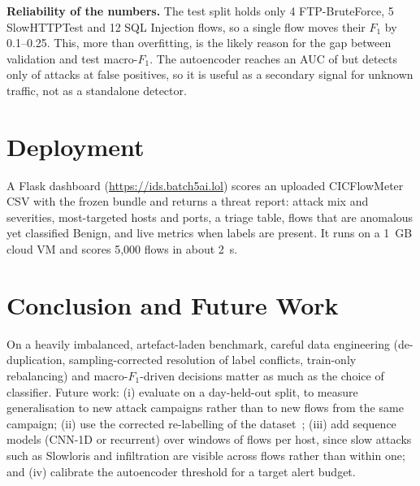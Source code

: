 \documentclass[conference]{IEEEtran}
\begin{document}
\textbf{Reliability of the numbers.} The test split holds only 4
FTP-BruteForce, 5 SlowHTTPTest and 12 SQL Injection flows, so a single flow
moves their $F_1$ by 0.1--0.25. This, more than overfitting, is the likely
reason for the gap between validation and test macro-$F_1$. The
autoencoder reaches an AUC of \AEAUC{} but detects only \AEDetectionRate{}
of attacks at \AEFalsePositiveRate{} false positives, so it is useful as a
secondary signal for unknown traffic, not as a standalone detector.

\section{Deployment}
A Flask dashboard (\url{https://ids.batch5ai.lol}) scores an uploaded
CICFlowMeter CSV with the frozen bundle and returns a threat report: attack
mix and severities, most-targeted hosts and ports, a triage table, flows that
are anomalous yet classified Benign, and live metrics when labels are present.
It runs on a 1~GB cloud VM and scores 5{,}000 flows in about 2~s.

\section{Conclusion and Future Work}\label{sec:conc}
On a heavily imbalanced, artefact-laden benchmark, careful data engineering
(de-duplication, sampling-corrected resolution of label conflicts, train-only
rebalancing) and
macro-$F_1$-driven decisions matter as much as the choice of classifier.
Future work: (i) evaluate on a day-held-out split, to measure generalisation
to new attack campaigns rather than to new flows from the same campaign;
(ii) use the corrected re-labelling of the dataset~\cite{liu2022};
(iii) add sequence models (CNN-1D or recurrent) over windows of flows per
host, since slow attacks such as Slowloris and infiltration are visible across
flows rather than within one; and (iv) calibrate the autoencoder threshold
for a target alert budget.

\end{document}
